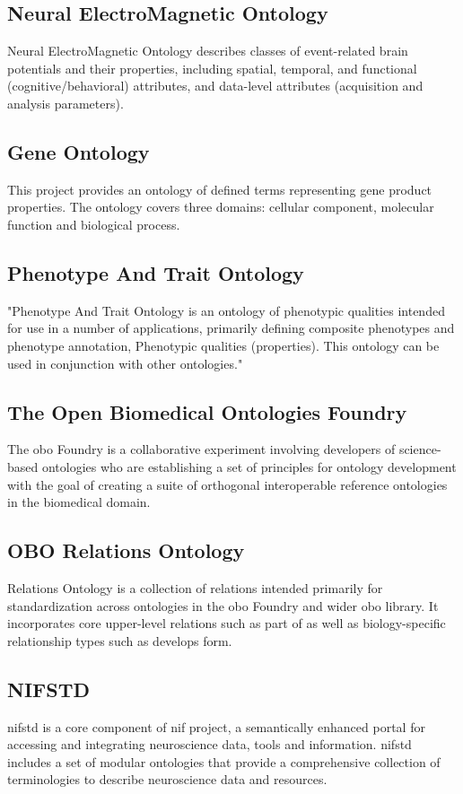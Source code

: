 \subsection{Neural ElectroMagnetic Ontology}
Neural ElectroMagnetic Ontology describes classes of event-related brain potentials and their properties, including spatial, temporal, and functional (cognitive/behavioral) attributes, and data-level attributes (acquisition and analysis parameters). \cite{nemo}
\subsection{Gene Ontology}
This project provides an ontology of defined terms representing gene product properties. 
The ontology covers three domains: cellular component, molecular function and biological process. \cite{bruha}
\subsection{Phenotype And Trait Ontology}
"Phenotype And Trait Ontology is an ontology of phenotypic qualities intended for use in a number of applications, primarily defining composite phenotypes and phenotype annotation, Phenotypic qualities (properties). This ontology can be used in conjunction with other ontologies." \cite{bruha}
\subsection{The Open Biomedical Ontologies Foundry}
The \gls{obo} Foundry is a collaborative experiment involving developers of science-based ontologies who are establishing a set of principles for ontology development with the goal of creating a suite of orthogonal interoperable reference ontologies in the biomedical domain. \cite{oen}
\subsection{OBO Relations Ontology}
Relations Ontology is a collection of relations intended primarily for standardization across ontologies in the \gls{obo} Foundry and wider \gls{obo} library. It incorporates core upper-level relations such as part of as well as biology-specific relationship types such as develops form. \cite{smith2005}
\subsection{NIFSTD}
\gls{nifstd} is a core component of \gls{nif} project, a semantically enhanced portal for accessing and integrating neuroscience data, tools and information. \gls{nifstd} includes a set of modular ontologies that provide a comprehensive collection of terminologies to describe neuroscience data and resources. \cite{nifstd}
